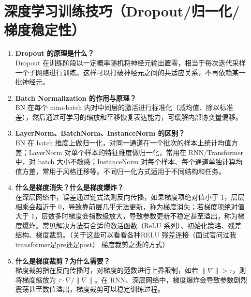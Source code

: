 \documentclass{article}
\begin{document}
\section{深度学习训练技巧（Dropout/归一化/梯度稳定性）}
\begin{enumerate}
\item \textbf{Dropout 的原理是什么？}\\
Dropout 在训练阶段以一定概率随机将神经元输出置零，相当于每次迭代采样一个子网络进行训练。这样可以打破神经元之间的共适应关系，不再依赖某一批神经元。

\item \textbf{Batch Normalization 的作用与原理？}\\
BN 在每个 mini-batch 内对中间层的激活进行标准化（减均值、除以标准差），然后通过可学习的缩放和平移恢复表达能力，可缓解内部协变量偏移。

\item \textbf{LayerNorm、BatchNorm、InstanceNorm 的区别？}\\
BN 在 batch 维度上做归一化，对同一通道在一个批次的样本上统计均值方差；LayerNorm 对单个样本的特征维度做归一化，常用在 RNN/Transformer 中，对 batch 大小不敏感；InstanceNorm 对每个样本、每个通道单独计算均值方差，常用于风格迁移等。不同归一化方式适用于不同结构和任务。

\item \textbf{什么是梯度消失？什么是梯度爆炸？}\\
在深层网络中，误差通过链式法则反向传播，如果梯度项绝对值小于 1，层层相乘会趋近于 0，导致靠前层几乎无法更新，称为梯度消失；若梯度项绝对值大于 1，层数多时梯度会指数级放大，导致参数更新不稳定甚至溢出，称为梯度爆炸。常见解决方法有合适的激活函数（ReLU 系列）、初始化策略、残差结构、梯度裁剪。（关于这些可以看看各种RELU 残差连接（面试官问过我transformer是pre还是post） 梯度裁剪之类的方式）

\item \textbf{什么是梯度裁剪？为什么需要？}\\
梯度裁剪指在反向传播时，对梯度的范数进行上界限制，如若 $\|\nabla\| > \tau$，则将梯度缩放为 $\tau \cdot \nabla/\|\nabla\|$。在 RNN、深层网络中，梯度爆炸会导致参数剧烈震荡甚至数值溢出，梯度裁剪可以稳定训练过程。
\end{enumerate}
\end{document}
